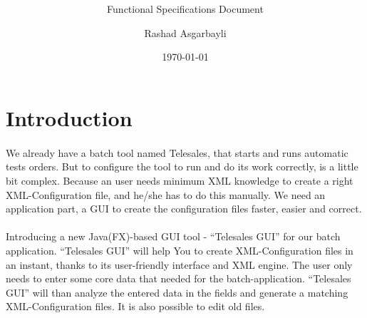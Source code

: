 \documentclass[hidelinks, a4paper, 11pt]{scrartcl}
\author{Rashad Asgarbayli}
\title{\vspace{3cm}
\app\vspace{20mm}}
\subtitle{Functional Specifications Document}
\date{\today}
\def\app{``Telesales GUI''}
\begin{document}
\maketitle
\thispagestyle{empty}

\newpage

\tableofcontents

\newpage


\section{Introduction}

\paragraph{}We already have a batch tool named Telesales, that starts and runs automatic tests orders. But to configure the tool to run and do its work correctly, is a little bit complex. Because an user needs minimum XML knowledge to create a right XML-Configuration file, and he/she has to do this manually. We need an application part, a GUI to create the configuration files faster, easier and correct.
\paragraph{}Introducing a new Java(FX)-based GUI tool - \app{} for our batch application. \app{} will help You to create XML-Configuration files in an instant, thanks to its user-friendly interface and XML engine. The user only needs to enter some core data that needed for the batch-application. \app{} will than analyze the entered data in the fields and generate a matching XML-Configuration files. It is also possible to edit old files.













%






\end{document}
